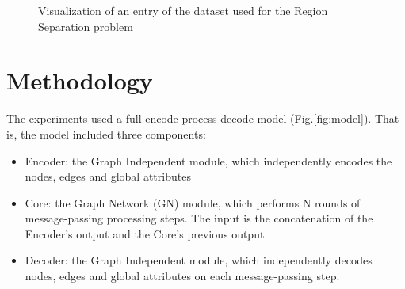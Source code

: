 \begin{figure}[H]
    \centering
    
    
    \caption{Visualization of an entry of the dataset used for the Region Separation problem}
    
    \label{fig:regions_separation_dataset_visualization}
\end{figure}


\section{Methodology}

The experiments used a full encode-process-decode model (Fig.\ref{fig:model}). That is, the model included three components:

\begin{itemize}

    \item Encoder: the Graph Independent module, which independently encodes the nodes, edges and global attributes
    
    \item Core: the Graph Network (GN) module, which performs N rounds of message-passing processing steps. The input is the concatenation of the Encoder’s output and the Core’s previous output.
    
    \item Decoder: the Graph Independent module, which independently decodes nodes, edges and global attributes on each message-passing step.

\end{itemize}

